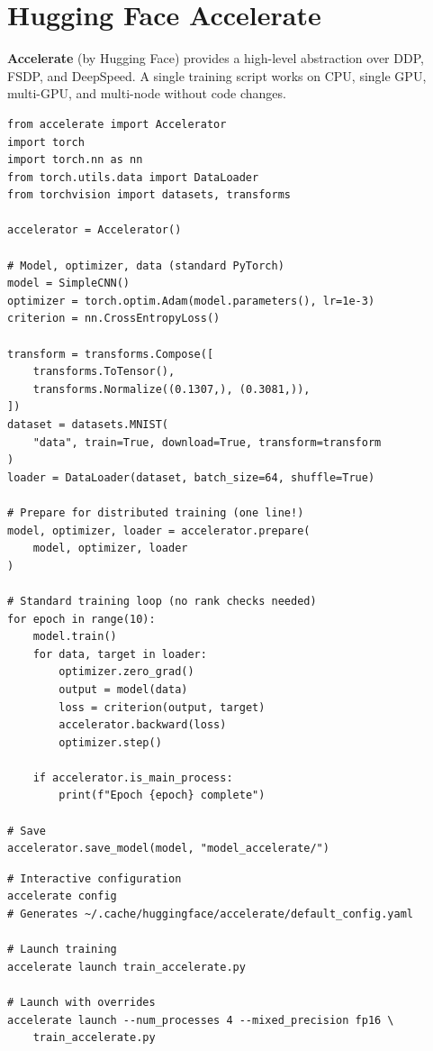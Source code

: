 \section{Hugging Face Accelerate}
\label{sec:accelerate}

\textbf{Accelerate} (by Hugging Face) provides a
high-level abstraction over DDP, FSDP, and DeepSpeed. A single training
script works on CPU, single GPU, multi-GPU, and multi-node without code
changes.

\begin{codeblock}[title=\textbf{Training with Accelerate}]
\begin{verbatim}
from accelerate import Accelerator
import torch
import torch.nn as nn
from torch.utils.data import DataLoader
from torchvision import datasets, transforms

accelerator = Accelerator()

# Model, optimizer, data (standard PyTorch)
model = SimpleCNN()
optimizer = torch.optim.Adam(model.parameters(), lr=1e-3)
criterion = nn.CrossEntropyLoss()

transform = transforms.Compose([
    transforms.ToTensor(),
    transforms.Normalize((0.1307,), (0.3081,)),
])
dataset = datasets.MNIST(
    "data", train=True, download=True, transform=transform
)
loader = DataLoader(dataset, batch_size=64, shuffle=True)

# Prepare for distributed training (one line!)
model, optimizer, loader = accelerator.prepare(
    model, optimizer, loader
)

# Standard training loop (no rank checks needed)
for epoch in range(10):
    model.train()
    for data, target in loader:
        optimizer.zero_grad()
        output = model(data)
        loss = criterion(output, target)
        accelerator.backward(loss)
        optimizer.step()

    if accelerator.is_main_process:
        print(f"Epoch {epoch} complete")

# Save
accelerator.save_model(model, "model_accelerate/")
\end{verbatim}
\end{codeblock}

\begin{codeblock}[title=\textbf{Accelerate configuration and launch}]
\begin{verbatim}
# Interactive configuration
accelerate config
# Generates ~/.cache/huggingface/accelerate/default_config.yaml

# Launch training
accelerate launch train_accelerate.py

# Launch with overrides
accelerate launch --num_processes 4 --mixed_precision fp16 \
    train_accelerate.py
\end{verbatim}
\end{codeblock}

